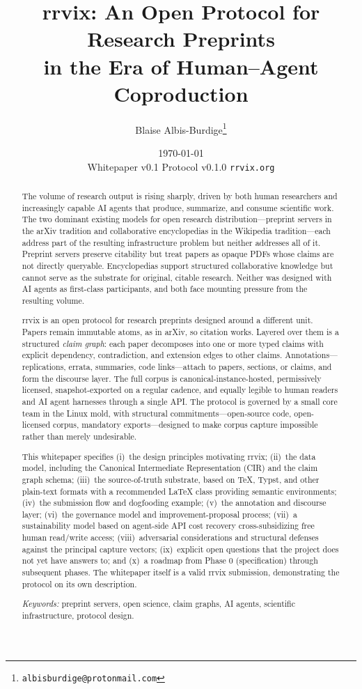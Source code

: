 \documentclass[11pt]{rrvix}
\title{\Large rrvix: An Open Protocol for Research Preprints \\[0.2em]
\large in the Era of Human--Agent Coproduction}
\author[1]{Blaise Albis-Burdige\thanks{\texttt{albisburdige@protonmail.com}}}
\affil[1]{}
\date{\today\\[0.5em]
\small Whitepaper v0.1 \textbullet{} Protocol v0.1.0 \textbullet{} \texttt{rrvix.org}}
\begin{document}
\maketitle

\begin{abstract}
\noindent The volume of research output is rising sharply, driven by both human researchers and increasingly capable AI agents that produce, summarize, and consume scientific work. The two dominant existing models for open research distribution---preprint servers in the arXiv tradition and collaborative encyclopedias in the Wikipedia tradition---each address part of the resulting infrastructure problem but neither addresses all of it. Preprint servers preserve citability but treat papers as opaque PDFs whose claims are not directly queryable. Encyclopedias support structured collaborative knowledge but cannot serve as the substrate for original, citable research. Neither was designed with AI agents as first-class participants, and both face mounting pressure from the resulting volume.

\medskip

\noindent rrvix is an open protocol for research preprints designed around a different unit. Papers remain immutable atoms, as in arXiv, so citation works. Layered over them is a structured \emph{claim graph}: each paper decomposes into one or more typed claims with explicit dependency, contradiction, and extension edges to other claims. Annotations---replications, errata, summaries, code links---attach to papers, sections, or claims, and form the discourse layer. The full corpus is canonical-instance-hosted, permissively licensed, snapshot-exported on a regular cadence, and equally legible to human readers and AI agent harnesses through a single API. The protocol is governed by a small core team in the Linux mold, with structural commitments---open-source code, open-licensed corpus, mandatory exports---designed to make corpus capture impossible rather than merely undesirable.

\medskip

\noindent This whitepaper specifies (i)~the design principles motivating rrvix; (ii)~the data model, including the Canonical Intermediate Representation (CIR) and the claim graph schema; (iii)~the source-of-truth substrate, based on TeX, Typst, and other plain-text formats with a recommended LaTeX class providing semantic environments; (iv)~the submission flow and dogfooding example; (v)~the annotation and discourse layer; (vi)~the governance model and improvement-proposal process; (vii)~a sustainability model based on agent-side API cost recovery cross-subsidizing free human read/write access; (viii)~adversarial considerations and structural defenses against the principal capture vectors; (ix)~explicit open questions that the project does not yet have answers to; and (x)~a roadmap from Phase 0 (specification) through subsequent phases. The whitepaper itself is a valid rrvix submission, demonstrating the protocol on its own description.

\medskip
\noindent\textit{Keywords:} preprint servers, open science, claim graphs, AI agents, scientific infrastructure, protocol design.
\end{abstract}
\end{document}
